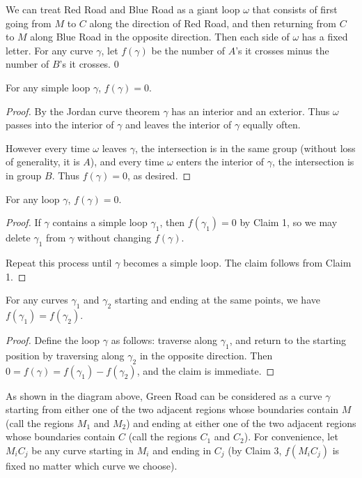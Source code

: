 We can treat Red Road and Blue Road as a giant loop $\omega$ that consists of first going from $M$ to $C$ along the direction of Red Road, and then returning from $C$ to $M$ along Blue Road in the opposite direction. Then each side of $\omega$ has a fixed letter. For any curve $\gamma$, let $f(\gamma)$ be the number of $A$'s it crosses minus the number of $B$'s it crosses.
\setcounter{claim}0
\begin{claim}
    For any simple loop $\gamma$, $f(\gamma)=0$.
\end{claim}
\begin{proof}
    By the Jordan curve theorem $\gamma$ has an interior and an exterior. Thus $\omega$ passes into the interior of $\gamma$ and leaves the interior of $\gamma$ equally often.

    However every time $\omega$ leaves $\gamma$, the intersection is in the same group (without loss of generality, it is $A$), and every time $\omega$ enters the interior of $\gamma$, the intersection is in group $B$. Thus $f(\gamma)=0$, as desired.
\end{proof}
\begin{claim}
    For any loop $\gamma$, $f(\gamma)=0$.
\end{claim}
\begin{proof}
    If $\gamma$ contains a simple loop $\gamma_1$, then $f(\gamma_1)=0$ by Claim 1, so we may delete $\gamma_1$ from $\gamma$ without changing $f(\gamma)$.

    Repeat this process until $\gamma$ becomes a simple loop. The claim follows from Claim 1.
\end{proof}
\begin{claim}
    For any curves $\gamma_1$ and $\gamma_2$ starting and ending at the same points, we have $f(\gamma_1)=f(\gamma_2)$.
\end{claim}
\begin{proof}
    Define the loop $\gamma$ as follows: traverse along $\gamma_1$, and return to the starting position by traversing along $\gamma_2$ in the opposite direction. Then $0=f(\gamma)=f(\gamma_1)-f(\gamma_2)$, and the claim is immediate.
\end{proof}

As shown in the diagram above, Green Road can be considered as a curve $\gamma$ starting from either one of the two adjacent regions whose boundaries contain $M$ (call the regions $M_1$ and $M_2$) and ending at either one of the two adjacent regions whose boundaries contain $C$ (call the regions $C_1$ and $C_2$). For convenience, let $M_iC_j$ be any curve starting in $M_i$ and ending in $C_j$ (by Claim 3, $f(M_iC_j)$ is fixed no matter which curve we choose).

